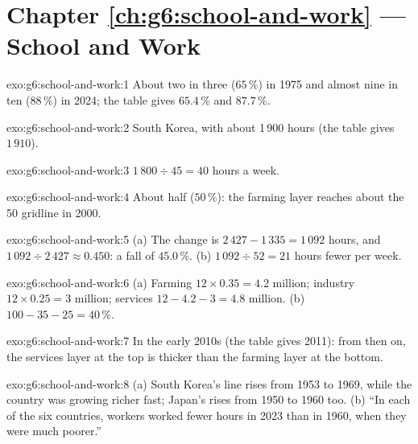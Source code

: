 \section*{Chapter \ref{ch:g6:school-and-work} --- School and Work}

\begin{solution}{exo:g6:school-and-work:1}
About two in three ($65\,\%$) in 1975 and almost nine in ten ($88\,\%$) in 2024;
the table gives $65.4\,\%$ and $87.7\,\%$.
\end{solution}

\begin{solution}{exo:g6:school-and-work:2}
South Korea, with about 1\,900 hours (the table gives $1\,910$).
\end{solution}

\begin{solution}{exo:g6:school-and-work:3}
$1\,800 \div 45 = 40$ hours a week.
\end{solution}

\begin{solution}{exo:g6:school-and-work:4}
About half ($50\,\%$): the farming layer reaches about the 50 gridline in 2000.
\end{solution}

\begin{solution}{exo:g6:school-and-work:5}
(a) The change is $2\,427 - 1\,335 = 1\,092$ hours, and $1\,092 \div 2\,427
\approx 0.450$: a fall of $45.0\,\%$. (b) $1\,092 \div 52 = 21$ hours fewer per
week.
\end{solution}

\begin{solution}{exo:g6:school-and-work:6}
(a) Farming $12 \times 0.35 = 4.2$ million; industry $12 \times 0.25 = 3$ million;
services $12 - 4.2 - 3 = 4.8$ million. (b) $100 - 35 - 25 = 40\,\%$.
\end{solution}

\begin{solution}{exo:g6:school-and-work:7}
In the early 2010s (the table gives 2011): from then on, the services layer at the
top is thicker than the farming layer at the bottom.
\end{solution}

\begin{solution}{exo:g6:school-and-work:8}
(a) South Korea's line rises from 1953 to 1969, while the country was growing
richer fast; Japan's rises from 1950 to 1960 too. (b) ``In each of the six
countries, workers worked fewer hours in 2023 than in 1960, when they were much
poorer.''
\end{solution}

